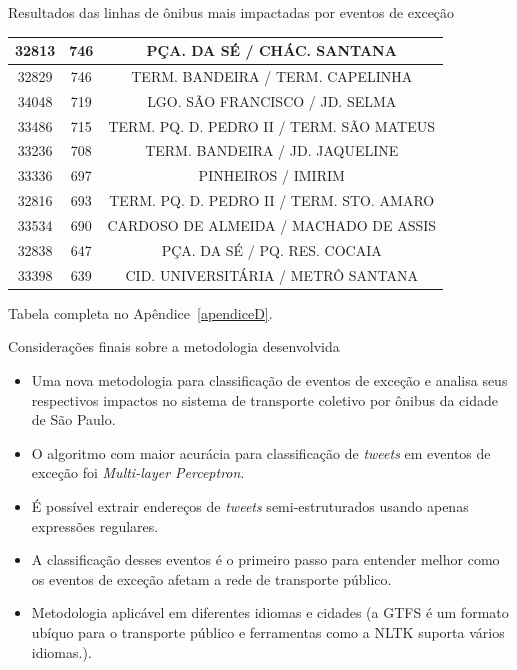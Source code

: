 \documentclass{beamer}
\begin{document}
\begin{frame}{Resultados das linhas de ônibus mais impactadas por eventos de exceção}
\begin {table} [!htb]
\begin{adjustbox}{max height=10mm, width=4in}
\begin{threeparttable}
\begin {tabular} {c|c|c}
    32813 & 746   & PÇA. DA SÉ / CHÁC. SANTANA  \\
\hline

    32829 & 746   & TERM. BANDEIRA / TERM. CAPELINHA  \\
\hline

    34048 & 719   & LGO. SÃO FRANCISCO / JD. SELMA  \\
\hline

    33486 & 715   & TERM. PQ. D. PEDRO II / TERM. SÃO MATEUS  \\
\hline

    33236 & 708   & TERM. BANDEIRA / JD. JAQUELINE  \\
\hline

    33336 & 697   & PINHEIROS / IMIRIM  \\
\hline

    32816 & 693   & TERM. PQ. D. PEDRO II / TERM. STO. AMARO  \\
\hline

    33534 & 690   & CARDOSO DE ALMEIDA / MACHADO DE ASSIS  \\
\hline

    32838 & 647   & PÇA. DA SÉ / PQ. RES. COCAIA  \\
\hline

    33398 & 639   & CID. UNIVERSITÁRIA / METRÔ SANTANA  \\
\bottomrule
\end{tabular}
\begin{tablenotes}
            \item[a] Tabela completa no Apêndice~\ref{apendiceD}.
        \end{tablenotes}
\end{threeparttable}
\end{adjustbox}
\end{table}
\end{frame}
\begin{frame}{Considerações finais sobre a metodologia desenvolvida}
\begin{itemize}
    \item Uma nova metodologia para classificação de eventos de exceção e analisa seus respectivos impactos no sistema de transporte coletivo por ônibus da cidade de São Paulo.
    \item O algoritmo com maior  acurácia para classificação de \textit{tweets} em eventos de exceção foi \textit{Multi-layer Perceptron}.
    \item É possível extrair endereços de \textit{tweets} semi-estruturados usando apenas expressões regulares.
    \item A classificação desses eventos é o primeiro passo para entender melhor como os eventos de exceção afetam a rede de transporte público.
    \item Metodologia aplicável em diferentes idiomas e cidades (a GTFS é um formato ubíquo para o transporte público e ferramentas como a NLTK suporta vários idiomas.).
\end{itemize}
\end{frame}
\end{document}
